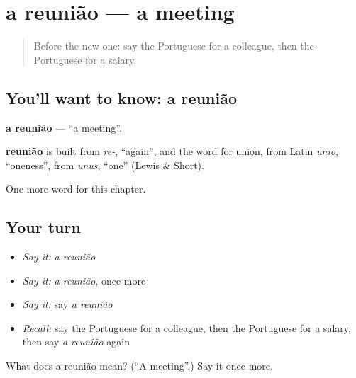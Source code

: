 \section[a reunião]{a reunião — a meeting}

\label{lesson:PT-C170-reuniao}



\begin{quote}
Before the new one: say the Portuguese for a colleague, then the Portuguese for a salary.
\end{quote}

\subsection*{You'll want to know: a reunião}
\textbf{a reunião} — \textquotedblleft{}a meeting\textquotedblright{}.

\begin{cousinweb}
\textbf{reunião} is built from \emph{re-}, \textquotedblleft{}again\textquotedblright{}, and the word for union, from Latin \emph{unio}, \textquotedblleft{}oneness\textquotedblright{}, from \emph{unus}, \textquotedblleft{}one\textquotedblright{} (Lewis \& Short).
\end{cousinweb}

\begin{grammarlens}[title={What you've built}]
One more word for this chapter.
\end{grammarlens}

\subsection*{Your turn}
\begin{itemize}
\raggedright
  \item \emph{Say it:} \emph{a reunião}
  \item \emph{Say it:} \emph{a reunião}, once more
  \item \emph{Say it:} say \emph{a reunião}
  \item \emph{Recall:} say the Portuguese for a colleague, then the Portuguese for a salary, then say \emph{a reunião} again
\end{itemize}

\begin{tcolorbox}[breakable,colback=teal!4,colframe=teal!35!black,title={Before you move on}]
What does a reunião mean? (\textquotedblleft{}A meeting\textquotedblright{}.) Say it once more.
\end{tcolorbox}
